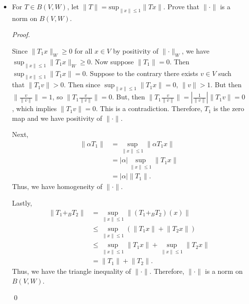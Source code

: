 \documentclass[12pt]{article}
\newenvironment{problem}[2][Problem]{\begin{trivlist}
\item[\hskip \labelsep {\bfseries #1}\hskip \labelsep {\bfseries
#2.}]}{\end{trivlist}}
\newenvironment{sol}
    {\emph{Proof.}
    }
    {
    \qed
    }
\begin{document}
\begin{problem}{4}
\begin{itemize}
\item[(b)] For $T \in B(V,W)$, let $\lVert T \rVert = \text{sup}_{\lVert x \rVert \leq 1} \lVert Tx \rVert$. Prove that $\lVert \cdot \rVert$ is a norm on $B(V,W)$.

\begin{sol}
Since $\lVert T_1x \rVert_W \geq 0$ for all $x \in V$ by positivity of $\lVert \cdot \rVert_W$, we have $\sup_{\lVert x \rVert \leq 1} \lVert T_1x \rVert_W \geq 0$. Now suppose $\lVert T_1 \rVert = 0$. Then $\sup_{\lVert x \rVert \leq 1} \lVert T_1x \rVert = 0$. Suppose to the contrary there exists $v \in V$ such that $\lVert T_1v \rVert > 0$. Then since $\sup_{\lVert x \rVert \leq 1} \lVert T_1x \rVert = 0$, $\lVert v \rVert > 1$. But then $\lVert \frac{v}{\lVert v \rVert} \rVert = 1$, so $\lVert T_1 \frac{v}{\lVert v \rVert} \rVert = 0$. But, then $\lVert T_1 \frac{v}{\lVert v \rVert} \rVert = \left| \frac{1}{\lVert v \rVert} \right| \lVert T_1v \rVert = 0$, which implies $\lVert T_1v \rVert = 0$. This is a contradiction. Therefore, $T_1$ is the zero map and we have positivity of $\lVert \cdot \rVert$.

\hspace{1 em} Next, \begin{align*}
    \lVert \alpha T_1 \rVert &= \sup_{\lVert x \rVert \leq 1} \lVert \alpha T_1x \rVert \tag*{(Definition of $\lVert \alpha T_1 \rVert$)} \\ &= \left| \alpha \right| \sup_{\lVert x \rVert \leq 1} \lVert T_1x \rVert \tag*{(Homogeneity of supremum norm)} \\ &= \left| \alpha \right| \lVert T_1 \rVert. \tag*{(Definition of $\lVert T_1 \rVert$)}
\end{align*} 
Thus, we have homogeneity of $\lVert \cdot \rVert$. 

\hspace{1 em} Lastly, \begin{align*}
    \lVert T_1 +_B T_2 \rVert &= \sup_{\lVert x \rVert \leq 1} \lVert (T_1 +_B T_2)(x) \rVert \tag*{(Definition of $\lVert T_1 +_B T_2 \rVert$)} \\ &\leq \sup_{\lVert x \rVert \leq 1} (\lVert T_1x \rVert + \lVert T_2x \rVert ) \tag*{(Triangle inequality of the norm on $W$)} \\ &\leq \sup_{\lVert x \rVert \leq 1} \lVert T_1x \rVert + \sup_{\lVert x \rVert \leq 1} \lVert T_2x \rVert \tag*{(Property of supremum norm)} \\ &= \lVert T_1 \rVert + \lVert T_2 \rVert. \tag*{(Definition of $\lVert T_1 \rVert$ and $\lVert T_2 \rVert$)}
\end{align*}
Thus, we have the triangle inequality of $\lVert \cdot \rVert$. Therefore, $\lVert \cdot \rVert$ is a norm on $B(V,W)$.
\end{sol}
\end{itemize}
\end{problem}
\end{document}
